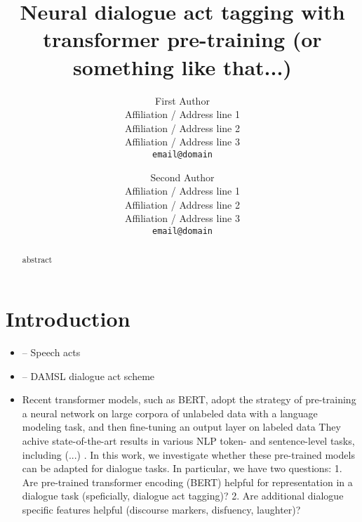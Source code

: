 \documentclass[11pt,a4paper]{article}
\title{Neural dialogue act tagging with transformer pre-training (or something like that...)}
\author{
  First Author \\
  Affiliation / Address line 1 \\
  Affiliation / Address line 2 \\
Affiliation / Address line 3 \\
  {\tt email@domain} \\\and
  Second Author \\
  Affiliation / Address line 1 \\
  Affiliation / Address line 2 \\
  Affiliation / Address line 3 \\
  {\tt email@domain} \\
}
\date{}
\begin{document}
\maketitle

\begin{abstract}
  abstract
\end{abstract}

\section{Introduction}
\begin{itemize}
  \item \cite{austinHowThingsWords2009} -- Speech acts
  \item \cite{coreCodingDialogsDAMSL1997} -- DAMSL dialogue act scheme
  \item Recent transformer models, such as BERT, adopt the strategy of pre-training a neural network
    on large corpora of unlabeled data with a language modeling task, 
    and then fine-tuning an output layer on labeled data
    They achive state-of-the-art results in various NLP token- and sentence-level tasks,
    including (...) \cite{devlinBERTPretrainingDeep2018}.
    In this work, we investigate whether these pre-trained models can be adapted for dialogue tasks.
    In particular, we have two questions:
    1. Are pre-trained transformer encoding (BERT) helpful for representation in a dialogue task (speficially, dialogue act tagging)?
    2. Are additional dialogue specific features helpful (discourse markers, disfuency, laughter)?
\end{itemize}
\end{document}
